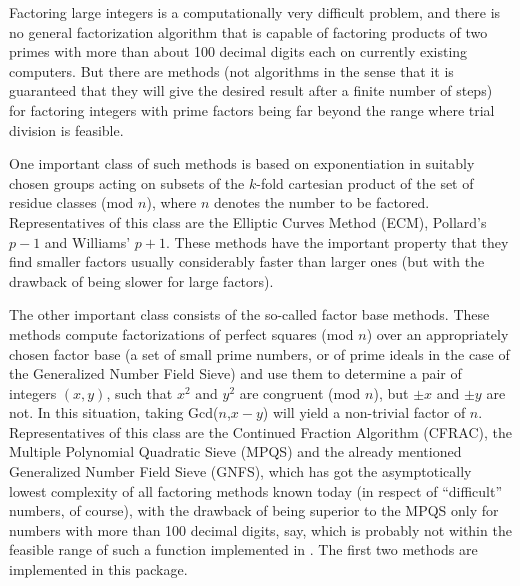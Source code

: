 

Factoring large integers is a computationally very difficult problem,
and there is no general factorization algorithm that is capable of
factoring products of two primes with more than about 100 decimal
digits each on currently existing computers. But there are methods
(not algorithms in the sense that it is guaranteed that they will give
the desired result after a finite number of steps) for factoring integers
with prime factors being far beyond the range where trial division is
feasible.

One important class of such methods is based on exponentiation in
suitably chosen groups acting on subsets of the $k$-fold cartesian
product of the set of residue classes (mod $n$), where $n$ denotes the
number to be factored.
Representatives of this class are the Elliptic Curves Method (ECM),
Pollard's $p-1$ and Williams' $p+1$.
These methods have the important property that they find smaller
factors usually considerably faster than larger ones
(but with the drawback of being slower for large factors).

The other important class consists of the so-called factor base methods.
These methods compute factorizations of perfect squares (mod $n$) over
an appropriately chosen factor base (a set of small prime numbers, or
of
prime ideals in the case of the
Generalized Number Field Sieve)
and use them to determine a pair of integers $(x,y)$, such that
$x^2$ and $y^2$ are congruent (mod $n$), but $\pm x$ and $\pm y$ are not.
In this situation, taking Gcd($n$,$x-y$) will yield a non-trivial
factor of $n$.
Representatives of this class are the Continued Fraction Algorithm
(CFRAC), the Multiple Polynomial Quadratic Sieve (MPQS) and the
already mentioned Generalized Number Field Sieve (GNFS), which has got
the asymptotically lowest complexity of all factoring methods known today
(in respect of ``difficult'' numbers, of course), with the drawback
of being superior to the MPQS only for numbers with more than 100
decimal digits, say, which is probably not within the feasible range
of such a function implemented in {\GAP}.
The first two methods are implemented in this package.

